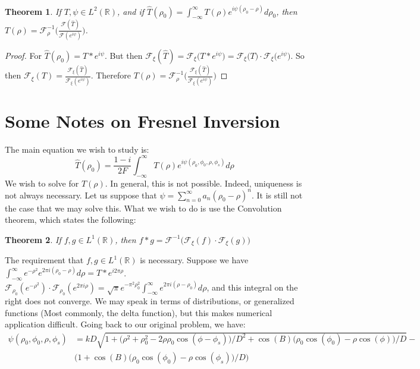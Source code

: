 \documentclass[oneside]{book}
\theoremstyle{mystyle}
\newtheorem{theorem}{Theorem}[section]
\begin{document}
\begin{theorem}
If $T,\psi \in L^2(\mathbb{R})$, and if $\hat{T}(\rho_0) = \int_{-\infty}^{\infty} T(\rho)e^{i\psi(\rho_0-\rho)}d\rho_0$, then $T(\rho) = \mathcal{F}^{-1}_{\rho}\big(\frac{\mathcal{F}(\hat{T})}{\mathcal{F}(e^{i\psi})}\big)$.
\end{theorem}
\begin{proof}
For $\hat{T}(\rho_0) = T* e^{i\psi}$. But then $\mathcal{F}_{\xi}(\hat{T}) = \mathcal{F}_{\xi}\big(T* e^{i\psi}\big) = \mathcal{F}_{\xi}\big(T\big)\cdot \mathcal{F}_{\xi}\big(e^{i\psi}\big)$. So then $\mathcal{F}_{\xi}(T) = \frac{\mathcal{F}_{\xi}(\hat{T})}{\mathcal{F}_{\xi}(e^{i\psi})}$. Therefore $T(\rho) = \mathcal{F}^{-1}_{\rho}\big(\frac{\mathcal{F}_{\xi}(\hat{T})}{\mathcal{F}_{\xi}(e^{i\psi})}\big)$
\end{proof}
\section{Some Notes on Fresnel Inversion}
The main equation we wish to study is:
\begin{equation*}
\hat{T}(\rho_0) = \frac{1-i}{2F}\int_{-\infty}^{\infty} T(\rho)e^{i\psi(\rho_0,\phi_0,\rho,\phi_s)}d\rho
\end{equation*}
We wish to solve for $T(\rho)$. In general, this is not possible. Indeed, uniqueness is not always necessary. Let us suppose that $\psi = \sum_{n=0}^{\infty}a_n(\rho_0 - \rho)^n$. It is still not the case that we may solve this. What we wish to do is use the Convolution theorem, which states the following:
\begin{theorem}
If $f,g\in L^{1}(\mathbb{R})$, then $f*g = \mathcal{F}^{-1}\big(\mathcal{F}_{\xi}(f)\cdot \mathcal{F}_{\xi}(g)\big)$
\end{theorem}
The requirement that $f,g\in L^{1}(\mathbb{R})$ is necessary. Suppose we have $\int_{-\infty}^{\infty} e^{-\rho^2}e^{2\pi i(\rho_0 - \rho)}d\rho = T*e^{i2\pi \rho}$. $\mathcal{F}_{\rho_0}(e^{-\rho^2})\cdot \mathcal{F}_{\rho_0}(e^{2\pi i \rho}) = \sqrt{\pi}e^{-\pi^2 \rho_0^2}\int_{-\infty}^{\infty}e^{2\pi i(\rho-\rho_0)}d\rho$, and this integral on the right does not converge. We may speak in terms of distributions, or generalized functions (Most commonly, the delta function), but this makes numerical application difficult. Going back to our original problem, we have:
\begin{align*}
\nonumber \psi(\rho_0,\phi_0,\rho,\phi_s) &= kD\sqrt{1+\big(\rho^2+\rho_0^2 - 2\rho \rho_0 \cos(\phi - \phi_s)\big)/D^2 + \cos(B)\big(\rho_0\cos(\phi_0) - \rho\cos(\phi)\big)/D} - \\ &\bigg(1+\cos(B)(\rho_0\cos(\phi_0) - \rho\cos(\phi_s)\big)/D\bigg)
\end{align*}
\end{document}
